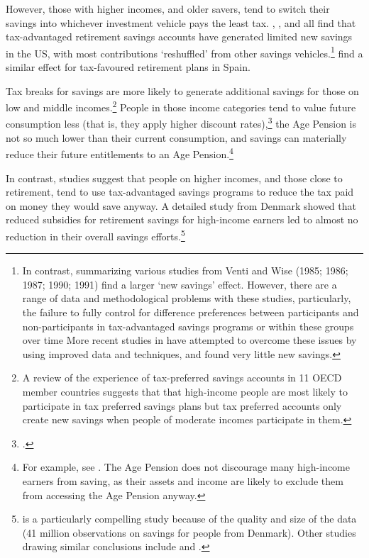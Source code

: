 \documentclass{grattanAlpha}
\begin{document}
However, those with higher incomes, and older savers, tend to switch their savings into whichever investment vehicle pays the least tax.  \textcite{EngenGale2000}, \textcite{AttanasioBanksWakefield2004}, and \textcite{Benjamin2003} all find that tax-advantaged retirement savings accounts have generated limited new savings in the US, with most contributions ‘reshuffled’ from other savings vehicles.\footnote{In contrast, \textcite{PoterbaVentiWise1996} summarizing various studies from Venti and Wise (1985; 1986; 1987; 1990; 1991) find a larger ‘new savings’ effect. 
However, there are a range of data and methodological problems with these studies, particularly, the failure to fully control for difference preferences between participants and non-participants in tax-advantaged savings programs or within these groups over time \textcite{EngenGaleScholz1996} More recent studies in \textcites{Benjamin2003}{EngenGale2000}  have attempted to overcome these issues by using improved data and techniques, and found very little new savings.}    \textcite{AyusoJimenoVillanueva2007} find a similar effect for tax-favoured retirement plans in Spain. 

Tax breaks for savings are more likely to generate additional savings for those on low and middle incomes.\footnote{\textcite{OECD2007EncourageSavingsThroughTaxPreferredAccounts} A review of the experience of tax-preferred savings accounts in 11 OECD member countries suggests that that high-income people are most likely to participate in tax preferred savings plans but tax preferred accounts only create new savings when people of moderate incomes participate in them.}
People in those income categories tend to value future consumption less (that is, they apply higher discount rates),\footcite{DynanSkinnerZeldes2004} the Age Pension is not so much lower than their current consumption, and savings can materially reduce their future entitlements to an Age Pension.\footnote{For example, see \textcite{BlundellEmmersonWafefield2006}. The Age Pension does not discourage many high-income earners from saving, as their assets and income are likely to exclude them from accessing the Age Pension anyway.} 

In contrast, studies suggest that people on higher incomes, and those close to retirement, \textcite{AyusoJimenoVillanueva2007} tend to use tax-advantaged savings programs to reduce the tax paid on money they would save anyway. A detailed study from Denmark showed that reduced subsidies for retirement savings for high-income earners led to almost no reduction in their overall savings efforts.\footnote{\textcite{ChettyFriedmanLethPetersenEtAl2014} is a particularly compelling study because of the quality and size of the data (41 million observations on savings for people from Denmark). Other studies drawing similar conclusions include \textcite{EngenGale2000} and \textcite{Benjamin2003}.}
\end{document}

